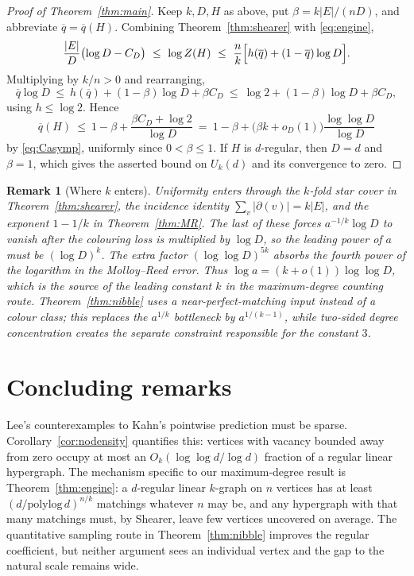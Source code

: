 \documentclass[10pt,a4paper]{amsart}
\newtheorem{remark}[theorem]{Remark}
\newcommand{\EE}{E}
\newcommand{\qbar}{\overline{q}}
\newcommand{\dg}{\partial}
\begin{document}
\begin{proof}[Proof of Theorem~\ref{thm:main}]
Keep $k,D,H$ as above, put $\beta=k|\EE|/(nD)$, and abbreviate $\qbar=\qbar(H)$. Combining
Theorem~\ref{thm:shearer} with \eqref{eq:engine},
\[
  \frac{|\EE|}{D}\bigl(\log D-C_D\bigr)\ \le\ \log Z(H)
  \ \le\ \frac{n}{k}\Bigl[h(\qbar)+(1-\qbar)\log D\Bigr].
\]
Multiplying by $k/n>0$ and rearranging,
\[
  \qbar\log D\ \le\ h(\qbar)+(1-\beta)\log D+\beta C_D
  \ \le\ \log2+(1-\beta)\log D+\beta C_D,
\]
using $h\le\log2$. Hence
\begin{equation}
\label{eq:final}
  \qbar(H)\ \le\ 1-\beta+\frac{\beta C_D+\log2}{\log D}
  \ =\ 1-\beta+\bigl(\beta k+o_D(1)\bigr)\frac{\log\log D}{\log D}
\end{equation}
by \eqref{eq:Casymp}, uniformly since $0<\beta\le1$. If $H$ is $d$-regular, then $D=d$
and $\beta=1$, which gives the asserted bound on $U_k(d)$ and its convergence to zero.
\end{proof}


\begin{remark}[Where $k$ enters]
\label{rem:kenters}
Uniformity enters through the $k$-fold star cover in Theorem~\ref{thm:shearer}, the
incidence identity $\sum_v|\dg(v)|=k|\EE|$, and the exponent $1-1/k$ in
Theorem~\ref{thm:MR}. The last of these forces $a^{-1/k}\log D$ to vanish after the
colouring loss is multiplied by $\log D$, so the leading power of $a$ must be
$(\log D)^k$. The extra factor $(\log\log D)^{5k}$ absorbs the fourth power of the
logarithm in the Molloy--Reed error. Thus $\log a=(k+o(1))\log\log D$, which is the
source of the leading constant $k$ in the maximum-degree counting route. Theorem~\ref{thm:nibble}
uses a near-perfect-matching input instead of a colour class; this replaces the
$a^{1/k}$ bottleneck by $a^{1/(k-1)}$, while two-sided degree concentration creates the
separate constraint responsible for the constant $3$.
\end{remark}

\section{Concluding remarks}
\label{sec:open}

Lee's counterexamples to Kahn's pointwise prediction must be sparse. Corollary~\ref{cor:nodensity}
quantifies this: vertices with vacancy bounded away from zero occupy at most an
$O_k(\log\log d/\log d)$ fraction of a regular linear hypergraph. The mechanism specific
to our maximum-degree result is Theorem~\ref{thm:engine}: a $d$-regular
linear $k$-graph on $n$ vertices has at least $(d/\mathrm{polylog}\,d)^{n/k}$ matchings
whatever $n$ may be, and any hypergraph with that many matchings must, by Shearer, leave
few vertices uncovered on average. The quantitative sampling route in
Theorem~\ref{thm:nibble} improves the regular coefficient, but neither argument sees an
individual vertex and the gap to the natural scale remains wide.
\end{document}
